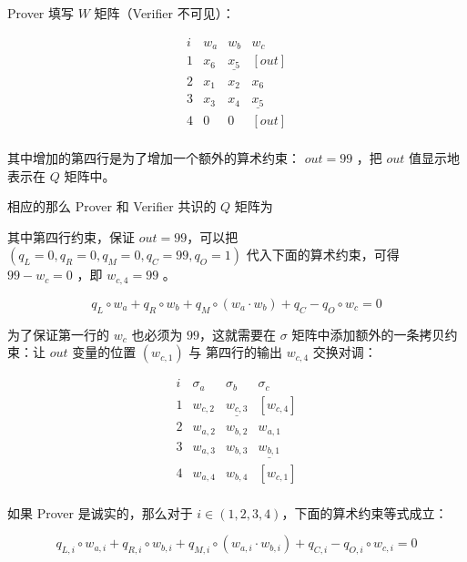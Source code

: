 Prover 填写 \(W\) 矩阵（Verifier 不可见）：

\[
\begin{array}{c|c|c|c|}
i & w_a & w_b & w_c  \\
\hline
1 & \boxed{x_6} & \underline{x_5} & [out] \\
2 & x_1 & x_2 & \boxed{x_6} \\
3 & x_3 & x_4 & \underline{x_5} \\
4 & 0 & 0 & [out] \\
\end{array}
\]

其中增加的第四行是为了增加一个额外的算术约束： \(out=99\) ，把 \(out\)
值显示地表示在 \(Q\) 矩阵中。

相应的那么 Prover 和 Verifier 共识的 \(Q\) 矩阵为


其中第四行约束，保证 \(out=99\)，可以把
\((q_L=0, q_R=0,q_M=0,q_C=99,q_O=1)\) 代入下面的算术约束，可得
\(99-w_c = 0\) ，即 \(w_{c,4}=99\) 。

\[
q_L \circ w_a + q_R \circ w_b + q_M\circ(w_a\cdot w_b) + q_C -  q_O\circ w_c = 0
\]

为了保证第一行的 \(w_c\) 也必须为 \(99\)，这就需要在 \(\sigma\)
矩阵中添加额外的一条拷贝约束：让 \(out\) 变量的位置 \((w_{c,1})\) 与
第四行的输出 \(w_{c,4}\) 交换对调：

\[
\begin{array}{c|c|c|c|}
i & \sigma_a & \sigma_b & \sigma_c  \\
\hline
1 & \boxed{w_{c,2}} & \underline{w_{c,3}} & [w_{c,4}] \\
2 & w_{a,2} & w_{b,2} & \boxed{w_{a,1}} \\
3 & w_{a,3} & w_{b,3} & \underline{w_{b,1}} \\
4 & w_{a,4} & w_{b,4} & [w_{c,1}]\\
\end{array}
\]

如果 Prover 是诚实的，那么对于
\(i\in(1,2,3,4)\)，下面的算术约束等式成立：

\[
q_{L,i} \circ w_{a,i} + q_{R,i} \circ w_{b,i} + q_{M,i}\circ(w_{a,i}\cdot w_{b,i}) + q_{C,i} -  q_{O,i}\circ w_{c,i} = 0
\]

